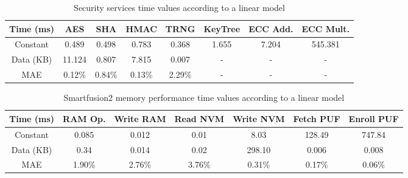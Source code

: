 \begin{table}[h!]
\centering
\def\arraystretch{1.5}
\begin{tabular}{|c|c|c|c|c|c|c|c|}
\hline
Time (ms) & AES    & SHA    & HMAC   & TRNG   & KeyTree & ECC Add. & ECC Mult.   \\ \hline
Constant  & 0.489  & 0.498 & 0.783  & 0.368  & 1.655   & 7.204 & 545.381 \\ \hline
Data (KB) & 11.124 & 0.807  & 7.815  & 0.007  & -       & -  & - \\ \hline
MAE       & 0.12\% & 0.84\% & 0.13\% & 2.29\% & -       & -  & - \\ \hline
\end{tabular}
\caption{Security services time values according to a linear model}
\label{tab:core-model}
\end{table}

\begin{table}[h!]
\centering
\def\arraystretch{1.5}
\begin{tabular}{|c|c|c|c|c|c|c|}
\hline
Time (ms) & RAM Op. & Write RAM & Read NVM & Write NVM & Fetch PUF & Enroll PUF \\ \hline
Constant  & 0.085     & 0.012     & 0.01     & 8.03      & 128.49    & 747.84  \\ \hline
Data (KB) & 0.34     & 0.014     & 0.02     & 298.10    & 0.006     & 0.008  \\ \hline
MAE       & 1.90\%    & 2.76\%    & 3.76\%   & 0.31\%    & 0.17\%    & 0.06\%  \\ \hline
\end{tabular}
\caption{Smartfusion2 memory performance time values according to a linear model}
\label{tab:core-model}
\end{table}
